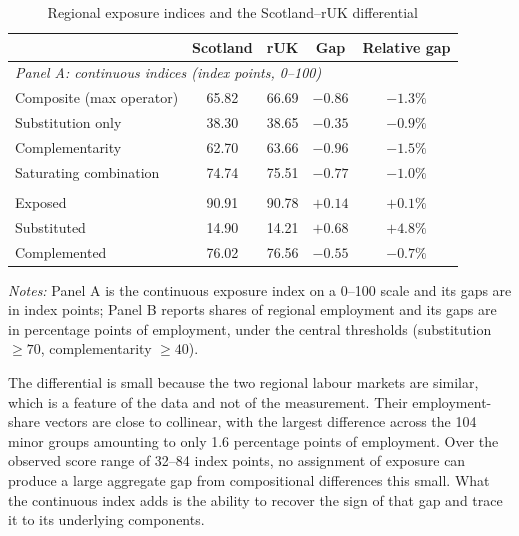 \begin{table}[t]
\centering
\caption{Regional exposure indices and the Scotland--rUK differential}
\label{tab:headline}
\small
\begin{tabular}{lcccc}
\toprule
 & Scotland & rUK & Gap & Relative gap \\
\midrule
\multicolumn{5}{l}{\textit{Panel A: continuous indices (index points, 0--100)}} \\
Composite (max operator)   & 65.82 & 66.69 & $-0.86$ & $-1.3\%$ \\
Substitution only          & 38.30 & 38.65 & $-0.35$ & $-0.9\%$ \\
Complementarity            & 62.70 & 63.66 & $-0.96$ & $-1.5\%$ \\
Saturating combination     & 74.74 & 75.51 & $-0.77$ & $-1.0\%$ \\
\addlinespace
\multicolumn{5}{l}{\textit{Panel B: classified employment shares (\%)}} \\
Exposed        & 90.91 & 90.78 & $+0.14$ & $+0.1\%$ \\
Substituted    & 14.90 & 14.21 & $+0.68$ & $+4.8\%$ \\
Complemented   & 76.02 & 76.56 & $-0.55$ & $-0.7\%$ \\
\bottomrule
\end{tabular}
\begin{minipage}{0.92\textwidth}
\vspace{0.4em}\footnotesize
\textit{Notes:} 
Panel A is the continuous exposure index on a 0--100 scale and its gaps are in index points; Panel B reports shares of regional employment and its gaps are in percentage points of employment, under the central thresholds (substitution $\ge 70$, complementarity $\ge 40$).
\end{minipage}
\end{table}
 
The differential is small because the two regional labour markets are similar, which is a feature of the data and not of the measurement. Their employment-share vectors are close to collinear, with the largest difference across the 104 minor groups amounting to only 1.6 percentage points of employment. Over the observed score range of 32--84 index points, no assignment of exposure can produce a large aggregate gap from compositional differences this small. What the continuous index adds is the ability to recover the sign of that gap and trace it to its underlying components.
 
 
